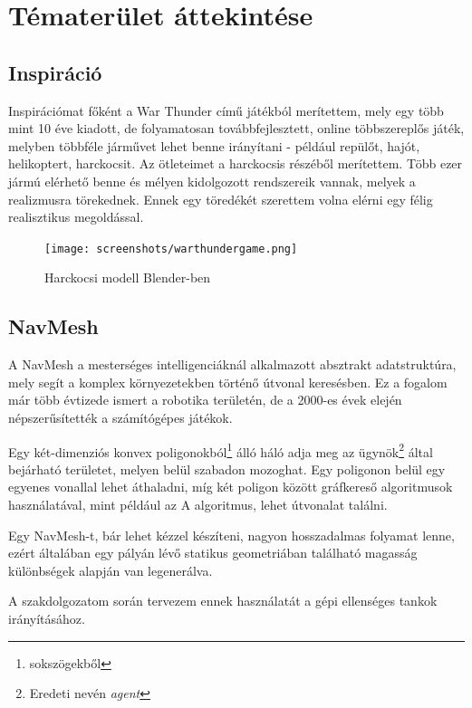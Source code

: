 \documentclass[
]{thesis-ekf}
\theoremstyle{definition}
\theoremstyle{remark}
\begin{document}
\chapter{Tématerület áttekintése}

\section{Inspiráció}

Inspirációmat főként a War Thunder\cite{warthunder} című játékból merítettem, mely egy több mint 10 éve kiadott, de folyamatosan továbbfejlesztett, online többszereplős játék, melyben többféle járművet lehet benne irányítani - például repülőt, hajót, helikoptert, harckocsit. Az ötleteimet a harckocsis részéből merítettem. Több ezer jármú elérhető benne és mélyen kidolgozott rendszereik vannak, melyek a realizmusra törekednek. Ennek egy töredékét szerettem volna elérni egy félig realisztikus megoldással.


\begin{figure}[H]
    \centering
    \texttt{[image: screenshots/warthundergame.png]}
    \caption{Harckocsi modell Blender-ben}
    \label{fig:warthundergame}
\end{figure}


\section{NavMesh}

A NavMesh\cite{navmesh} a mesterséges intelligenciáknál alkalmazott absztrakt adatstruktúra, mely segít a komplex környezetekben történő útvonal keresésben. Ez a fogalom már több évtizede ismert a robotika területén, de a 2000-es évek elején népszerűsítették a számítógépes játékok.

Egy két-dimenziós konvex poligonokból\footnote{sokszögekből} álló háló adja meg az ügynök\footnote{Eredeti nevén \emph{agent}} által bejárható területet, melyen belül szabadon mozoghat. Egy poligonon belül egy egyenes vonallal lehet áthaladni, míg két poligon között gráfkereső algoritmusok használatával, mint például az A\* algoritmus, lehet útvonalat találni.

Egy NavMesh-t, bár lehet kézzel készíteni, nagyon hosszadalmas folyamat lenne, ezért általában egy pályán lévő statikus geometriában található magasság különbségek alapján van legenerálva.

A szakdolgozatom során tervezem ennek használatát a gépi ellenséges tankok irányításához.
\end{document}
